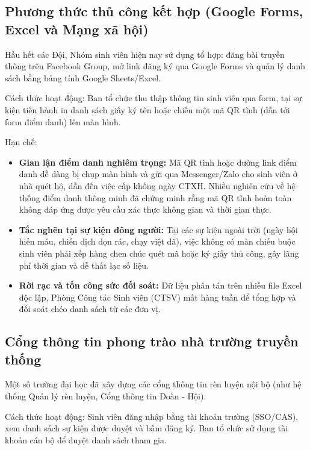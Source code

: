 \subsection{Phương thức thủ công kết hợp (Google Forms, Excel và Mạng xã hội)}

Hầu hết các Đội, Nhóm sinh viên hiện nay sử dụng tổ hợp: đăng bài truyền thông trên Facebook Group, mở link đăng ký qua Google Forms và quản lý danh sách bằng bảng tính Google Sheets/Excel.

Cách thức hoạt động: Ban tổ chức thu thập thông tin sinh viên qua form, tại sự kiện tiến hành in danh sách giấy ký tên hoặc chiếu một mã QR tĩnh (dẫn tới form điểm danh) lên màn hình.

Hạn chế:
\begin{itemize}
    \item \textbf{Gian lận điểm danh nghiêm trọng:} Mã QR tĩnh hoặc đường link điểm danh dễ dàng bị chụp màn hình và gửi qua Messenger/Zalo cho sinh viên ở nhà quét hộ, dẫn đến việc cấp khống ngày CTXH. Nhiều nghiên cứu về hệ thống điểm danh thông minh đã chứng minh rằng mã QR tĩnh hoàn toàn không đáp ứng được yêu cầu xác thực không gian và thời gian thực\cite{patel2022smart, shariff2021location}.
    \item \textbf{Tắc nghẽn tại sự kiện đông người:} Tại các sự kiện ngoài trời (ngày hội hiến máu, chiến dịch dọn rác, chạy việt dã), việc không có màn chiếu buộc sinh viên phải xếp hàng chen chúc quét mã hoặc ký giấy thủ công, gây lãng phí thời gian và dễ thất lạc số liệu.
    \item \textbf{Rời rạc và tốn công sức đối soát:} Dữ liệu phân tán trên nhiều file Excel độc lập, Phòng Công tác Sinh viên (CTSV) mất hàng tuần để tổng hợp và đối soát chéo danh sách từ các đơn vị.
\end{itemize}

\subsection{Cổng thông tin phong trào nhà trường truyền thống}

Một số trường đại học đã xây dựng các cổng thông tin rèn luyện nội bộ (như hệ thống Quản lý rèn luyện, Cổng thông tin Đoàn - Hội).

Cách thức hoạt động: Sinh viên đăng nhập bằng tài khoản trường (SSO/CAS), xem danh sách sự kiện được duyệt và bấm đăng ký. Ban tổ chức sử dụng tài khoản cán bộ để duyệt danh sách tham gia.

